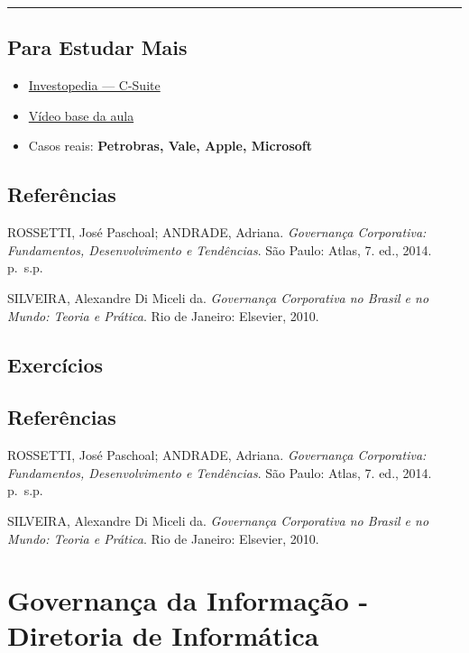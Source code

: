 \documentclass[
]{book}
\providecommand{\tightlist}{%
  \setlength{\itemsep}{0pt}\setlength{\parskip}{0pt}}
\begin{document}
\begin{center}\rule{0.5\linewidth}{0.5pt}\end{center}

\section{Para Estudar Mais}\label{para-estudar-mais}

\begin{itemize}
\tightlist
\item
  \href{https://www.investopedia.com/terms/c/c-suite.asp}{Investopedia --- C-Suite}\\
\item
  \href{https://www.youtube.com/watch?v=AwkeSgUtots}{Vídeo base da aula}\\
\item
  Casos reais: \textbf{Petrobras, Vale, Apple, Microsoft}
\end{itemize}

\section{Referências}\label{referuxeancias-3}

ROSSETTI, José Paschoal; ANDRADE, Adriana. \emph{Governança Corporativa: Fundamentos, Desenvolvimento e Tendências}. São Paulo: Atlas, 7. ed., 2014. p.~s.p.

SILVEIRA, Alexandre Di Miceli da. \emph{Governança Corporativa no Brasil e no Mundo: Teoria e Prática}. Rio de Janeiro: Elsevier, 2010.

\section{Exercícios}\label{exercuxedcios-3}

\section{Referências}\label{referuxeancias-4}

ROSSETTI, José Paschoal; ANDRADE, Adriana. \emph{Governança Corporativa: Fundamentos, Desenvolvimento e Tendências}. São Paulo: Atlas, 7. ed., 2014. p.~s.p.

SILVEIRA, Alexandre Di Miceli da. \emph{Governança Corporativa no Brasil e no Mundo: Teoria e Prática}. Rio de Janeiro: Elsevier, 2010.

\chapter{Governança da Informação - Diretoria de Informática}\label{governanuxe7a-da-informauxe7uxe3o---diretoria-de-informuxe1tica}
\end{document}
